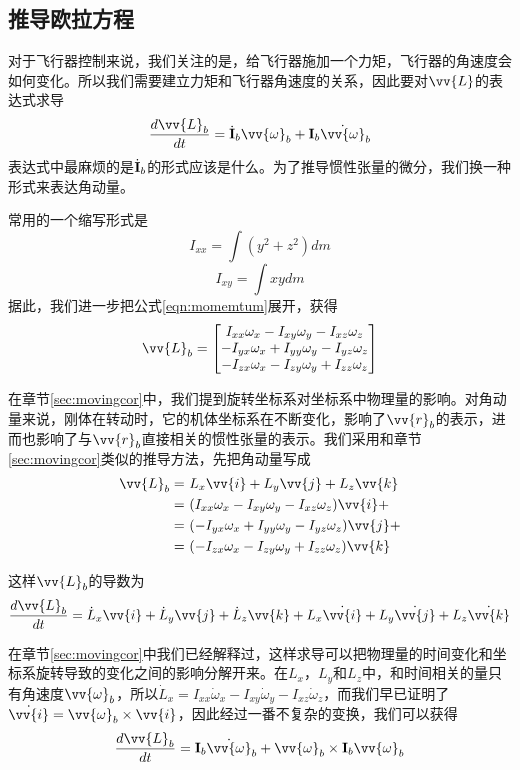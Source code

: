 \documentclass[11pt]{article}
\begin{document}
\subsection{推导欧拉方程}
对于飞行器控制来说，我们关注的是，给飞行器施加一个力矩，飞行器的角速度会如何变化。所以我们需要建立力矩和飞行器角速度的关系，因此要对$\vv{L}$的表达式求导
$$
\frac{d\vv{L}_b}{dt} = \dot{{\bf I}}_b\vv{\omega}_b + {\bf I}_b \dot{\vv{\omega}}_b   
$$
表达式中最麻烦的是$\dot{{\bf I}}_b$的形式应该是什么。为了推导惯性张量的微分，我们换一种形式来表达角动量。

常用的一个缩写形式是
$$
I_{xx} = \int (y^2+z^2) dm
$$
$$
I_{xy} = \int xy dm
$$
据此，我们进一步把公式\ref{eqn:momemtum}展开，获得
$$
\vv{L}_b = 
\begin{bmatrix}
I_{xx}\omega_x-I_{xy}\omega_y-I_{xz}\omega_z\\
-I_{yx}\omega_x+I_{yy}\omega_y-I_{yz}\omega_z\\
-I_{zx}\omega_x-I_{zy}\omega_y+I_{zz}\omega_z
\end{bmatrix}
$$

在章节\ref{sec:movingcor}中，我们提到旋转坐标系对坐标系中物理量的影响。对角动量来说，刚体在转动时，它的机体坐标系在不断变化，影响了$\vv{r}_b$的表示，进而也影响了与$\vv{r}_b$直接相关的惯性张量的表示。我们采用和章节\ref{sec:movingcor}类似的推导方法，先把角动量写成
\begin{align*}
\vv{L}_b = & \ L_x \vv{i} + L_y \vv{j} + L_z \vv{k} \\
	   = & \ (I_{xx}\omega_x-I_{xy}\omega_y-I_{xz}\omega_z)\vv{i} + \\
	   = & \ (-I_{yx}\omega_x+I_{yy}\omega_y-I_{yz}\omega_z)\vv{j} + \\
	   = & \ (-I_{zx}\omega_x-I_{zy}\omega_y+I_{zz}\omega_z)\vv{k} 
\end{align*}

这样$\vv{L}_b$的导数为
$$
\frac{d\vv{L}_b}{dt} =  \dot{L}_x \vv{i} + \dot{L}_y \vv{j} + \dot{L}_z \vv{k} + L_x \dot{\vv{i}} + L_y \dot{\vv{j}} + L_z \dot{\vv{k}} 
$$

在章节\ref{sec:movingcor}中我们已经解释过，这样求导可以把物理量的时间变化和坐标系旋转导致的变化之间的影响分解开来。在$L_x$，$L_y$和$L_z$中，和时间相关的量只有角速度$\vv{\omega}_b$，所以$\dot{L}_x = I_{xx}\dot{\omega}_x-I_{xy}\dot{\omega}_y-I_{xz}\dot{\omega}_z$，而我们早已证明了$\dot{\vv{i}} = \vv{\omega}_b \times \vv{i}$，因此经过一番不复杂的变换，我们可以获得
$$
\frac{d\vv{L}_b}{dt} = {\bf I}_b\dot{\vv{\omega}}_b + \vv{\omega}_b\times{\bf I}_b\vv{\omega}_b
$$
\end{document}
